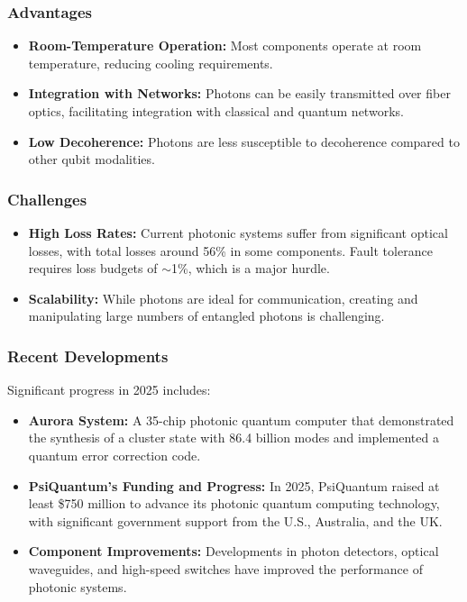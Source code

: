 \subsubsection*{Advantages}

\begin{itemize}
  \item \textbf{Room-Temperature Operation:} Most components operate at room
    temperature, reducing cooling requirements.
  \item \textbf{Integration with Networks:} Photons can be easily transmitted
    over fiber optics, facilitating integration with classical and quantum
    networks.
  \item \textbf{Low Decoherence:} Photons are less susceptible to decoherence
    compared to other qubit modalities.
\end{itemize}

\subsubsection*{Challenges}

\begin{itemize}
  \item \textbf{High Loss Rates:} Current photonic systems suffer from
    significant optical losses, with total losses around 56\% in some
    components. Fault tolerance requires loss budgets of $\sim$1\%, which is
    a major hurdle.
  \item \textbf{Scalability:} While photons are ideal for communication,
    creating and manipulating large numbers of entangled photons is challenging.
\end{itemize}

\subsubsection*{Recent Developments}

Significant progress in 2025 includes:

\begin{itemize}
  \item \textbf{Aurora System:} A 35-chip photonic quantum computer that
    demonstrated the synthesis of a cluster state with 86.4 billion modes and
    implemented a quantum error correction code.
  \item \textbf{PsiQuantum's Funding and Progress:} In 2025, PsiQuantum
    raised at least \$750 million to advance its photonic quantum computing
    technology, with significant government support from the U.S., Australia,
    and the UK.
  \item \textbf{Component Improvements:} Developments in photon detectors,
    optical waveguides, and high-speed switches have improved the performance
    of photonic systems.
\end{itemize}

